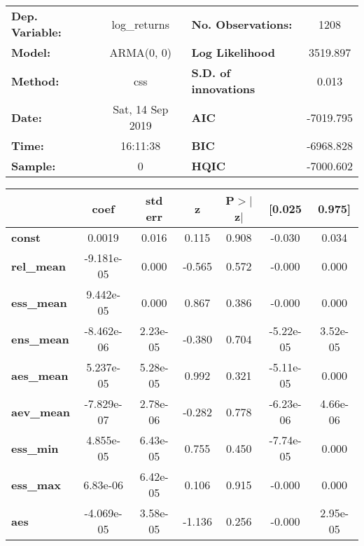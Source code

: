 \begin{center}
\begin{tabular}{lclc}
\toprule
\textbf{Dep. Variable:} &   log\_returns   & \textbf{  No. Observations:  } &    1208     \\
\textbf{Model:}         &    ARMA(0, 0)    & \textbf{  Log Likelihood     } &  3519.897   \\
\textbf{Method:}        &       css        & \textbf{  S.D. of innovations} &   0.013     \\
\textbf{Date:}          & Sat, 14 Sep 2019 & \textbf{  AIC                } & -7019.795   \\
\textbf{Time:}          &     16:11:38     & \textbf{  BIC                } & -6968.828   \\
\textbf{Sample:}        &        0         & \textbf{  HQIC               } & -7000.602   \\
\bottomrule
\end{tabular}
\begin{tabular}{lcccccc}
                   & \textbf{coef} & \textbf{std err} & \textbf{z} & \textbf{P$> |$z$|$} & \textbf{[0.025} & \textbf{0.975]}  \\
\midrule
\textbf{const}     &       0.0019  &        0.016     &     0.115  &         0.908        &       -0.030    &        0.034     \\
\textbf{rel\_mean} &   -9.181e-05  &        0.000     &    -0.565  &         0.572        &       -0.000    &        0.000     \\
\textbf{ess\_mean} &    9.442e-05  &        0.000     &     0.867  &         0.386        &       -0.000    &        0.000     \\
\textbf{ens\_mean} &   -8.462e-06  &     2.23e-05     &    -0.380  &         0.704        &    -5.22e-05    &     3.52e-05     \\
\textbf{aes\_mean} &    5.237e-05  &     5.28e-05     &     0.992  &         0.321        &    -5.11e-05    &        0.000     \\
\textbf{aev\_mean} &   -7.829e-07  &     2.78e-06     &    -0.282  &         0.778        &    -6.23e-06    &     4.66e-06     \\
\textbf{ess\_min}  &    4.855e-05  &     6.43e-05     &     0.755  &         0.450        &    -7.74e-05    &        0.000     \\
\textbf{ess\_max}  &     6.83e-06  &     6.42e-05     &     0.106  &         0.915        &       -0.000    &        0.000     \\
\textbf{aes}       &   -4.069e-05  &     3.58e-05     &    -1.136  &         0.256        &       -0.000    &     2.95e-05     \\
\bottomrule
\end{tabular}
\end{center}

